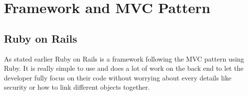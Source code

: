 \documentclass[12pt,a4paper]{article}
\begin{document}



\section{Framework and MVC Pattern}\label{framework}
\subsection{Ruby on Rails}
As stated earlier Ruby on Rails is a framework following the MVC pattern using Ruby. It is really simple to use and does a lot of work on the back end to let the developer fully focus on their code without worrying about every details like security or how to link different objects together.
\end{document}

